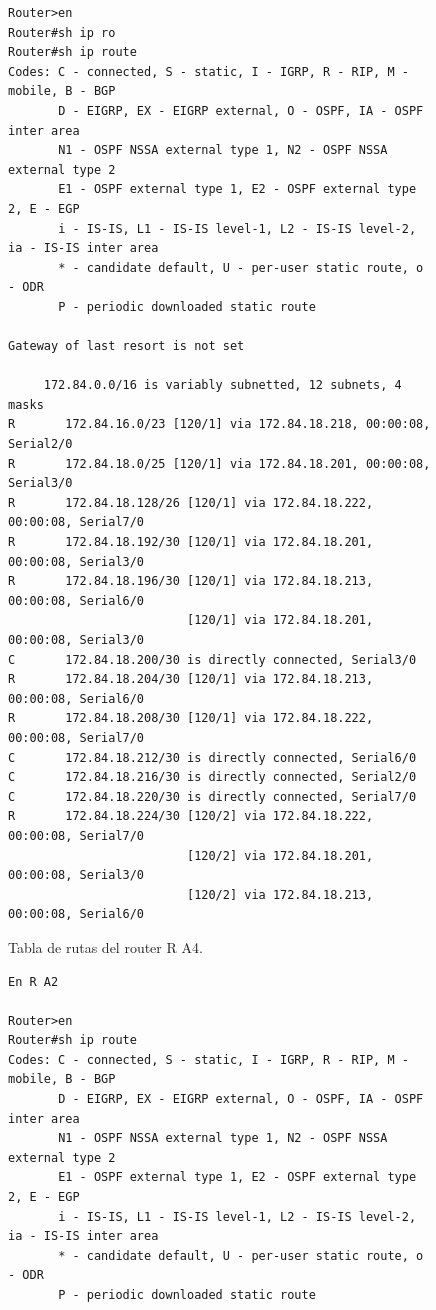 \documentclass[11pt]{article}
\begin{document}
\begin{enumerate}
\begin{figure}[h]
\begin{verbatim}
Router>en
Router#sh ip ro
Router#sh ip route 
Codes: C - connected, S - static, I - IGRP, R - RIP, M - mobile, B - BGP
       D - EIGRP, EX - EIGRP external, O - OSPF, IA - OSPF inter area
       N1 - OSPF NSSA external type 1, N2 - OSPF NSSA external type 2
       E1 - OSPF external type 1, E2 - OSPF external type 2, E - EGP
       i - IS-IS, L1 - IS-IS level-1, L2 - IS-IS level-2, ia - IS-IS inter area
       * - candidate default, U - per-user static route, o - ODR
       P - periodic downloaded static route

Gateway of last resort is not set

     172.84.0.0/16 is variably subnetted, 12 subnets, 4 masks
R       172.84.16.0/23 [120/1] via 172.84.18.218, 00:00:08, Serial2/0
R       172.84.18.0/25 [120/1] via 172.84.18.201, 00:00:08, Serial3/0
R       172.84.18.128/26 [120/1] via 172.84.18.222, 00:00:08, Serial7/0
R       172.84.18.192/30 [120/1] via 172.84.18.201, 00:00:08, Serial3/0
R       172.84.18.196/30 [120/1] via 172.84.18.213, 00:00:08, Serial6/0
                         [120/1] via 172.84.18.201, 00:00:08, Serial3/0
C       172.84.18.200/30 is directly connected, Serial3/0
R       172.84.18.204/30 [120/1] via 172.84.18.213, 00:00:08, Serial6/0
R       172.84.18.208/30 [120/1] via 172.84.18.222, 00:00:08, Serial7/0
C       172.84.18.212/30 is directly connected, Serial6/0
C       172.84.18.216/30 is directly connected, Serial2/0
C       172.84.18.220/30 is directly connected, Serial7/0
R       172.84.18.224/30 [120/2] via 172.84.18.222, 00:00:08, Serial7/0
                         [120/2] via 172.84.18.201, 00:00:08, Serial3/0
                         [120/2] via 172.84.18.213, 00:00:08, Serial6/0
\end{verbatim}
\caption{Tabla de rutas del router R A4.}
\label{fig:2.1.1.4.1}
\end{figure}

\begin{figure}[h]
\begin{verbatim}
En R A2

Router>en
Router#sh ip route
Codes: C - connected, S - static, I - IGRP, R - RIP, M - mobile, B - BGP
       D - EIGRP, EX - EIGRP external, O - OSPF, IA - OSPF inter area
       N1 - OSPF NSSA external type 1, N2 - OSPF NSSA external type 2
       E1 - OSPF external type 1, E2 - OSPF external type 2, E - EGP
       i - IS-IS, L1 - IS-IS level-1, L2 - IS-IS level-2, ia - IS-IS inter area
       * - candidate default, U - per-user static route, o - ODR
       P - periodic downloaded static route


\end{verbatim}
\end{figure}
\end{enumerate}
\end{document}
